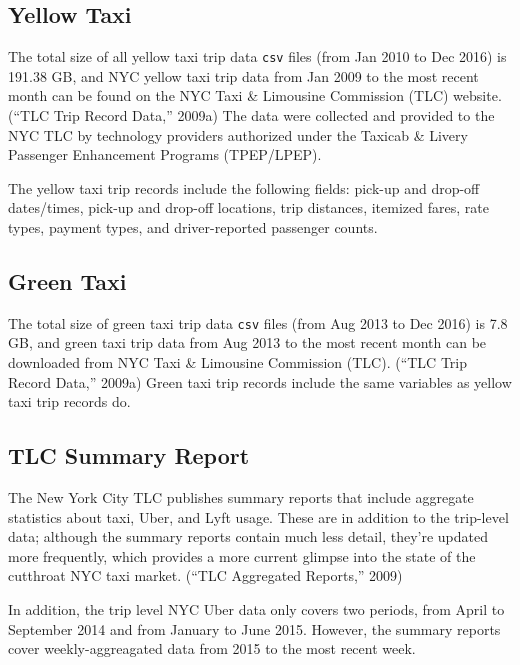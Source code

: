 \documentclass[12pt,twoside]{reedthesis}
\theoremstyle{definition}
\theoremstyle{definition}
\theoremstyle{definition}
\theoremstyle{remark}
\begin{document}
\subsection{Yellow Taxi}\label{yellow-taxi-1}

The total size of all yellow taxi trip data \texttt{csv} files (from Jan
2010 to Dec 2016) is 191.38 GB, and NYC yellow taxi trip data from Jan
2009 to the most recent month can be found on the NYC Taxi \& Limousine
Commission (TLC) website. (``TLC Trip Record Data,'' 2009a) The data
were collected and provided to the NYC TLC by technology providers
authorized under the Taxicab \& Livery Passenger Enhancement Programs
(TPEP/LPEP).

The yellow taxi trip records include the following fields: pick-up and
drop-off dates/times, pick-up and drop-off locations, trip distances,
itemized fares, rate types, payment types, and driver-reported passenger
counts.

\subsection{Green Taxi}\label{green-taxi-1}

The total size of green taxi trip data \texttt{csv} files (from Aug 2013
to Dec 2016) is 7.8 GB, and green taxi trip data from Aug 2013 to the
most recent month can be downloaded from NYC Taxi \& Limousine
Commission (TLC). (``TLC Trip Record Data,'' 2009a) Green taxi trip
records include the same variables as yellow taxi trip records do.

\subsection{TLC Summary Report}\label{tlc-summary-report}

The New York City TLC publishes summary reports that include aggregate
statistics about taxi, Uber, and Lyft usage. These are in addition to
the trip-level data; although the summary reports contain much less
detail, they're updated more frequently, which provides a more current
glimpse into the state of the cutthroat NYC taxi market. (``TLC
Aggregated Reports,'' 2009)

In addition, the trip level NYC Uber data only covers two periods, from
April to September 2014 and from January to June 2015. However, the
summary reports cover weekly-aggreagated data from 2015 to the most
recent week.
\end{document}
